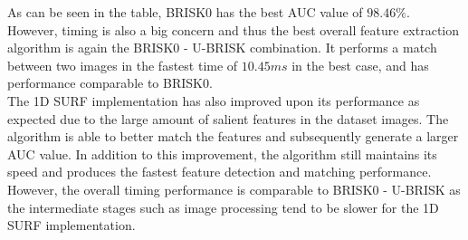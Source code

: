 \documentclass[11pt]{report}
\begin{document}
As can be seen in the table, BRISK0 has the best AUC value of $98.46\%$. However, timing is also a big concern and thus the best overall feature extraction algorithm is again the BRISK0 - U-BRISK combination. It performs a match between two images in the fastest time of $10.45 ms$ in the best case, and has performance comparable to BRISK0.\\  

The 1D SURF implementation has also improved upon its performance as expected due to the large amount of salient features in the dataset images. The algorithm is able to better match the features and subsequently generate a larger AUC value. In addition to this improvement, the algorithm still maintains its speed and produces the fastest feature detection and matching performance. However, the overall timing performance is comparable to BRISK0 - U-BRISK as the intermediate stages such as image processing tend to be slower for the 1D SURF implementation.\\



\end{document}
